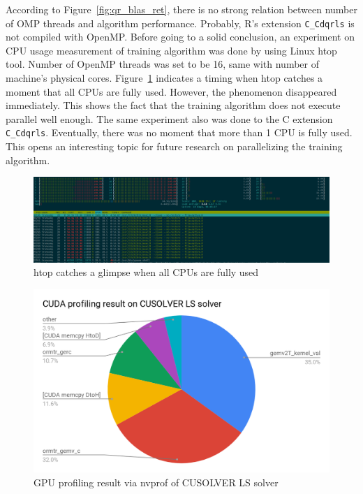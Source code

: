 \documentclass[English]{dicomopapers}
\begin{document}
 According to Figure~\ref{fig:qr_blas_ret}, there is no strong relation between number of OMP threads and algorithm performance. Probably, R's extension \texttt{C\_Cdqrls} is not compiled with OpenMP\@. Before going to a solid conclusion, an experiment on CPU usage measurement of training algorithm was done by using Linux htop tool. Number of OpenMP threads was set to be 16, same with number of machine's physical cores. Figure~\ref{fig:htop} indicates a timing when htop catches a moment that all CPUs are fully used. However, the phenomenon disappeared immediately. This shows the fact that the training algorithm does not execute parallel well enough. The same experiment also was done to the C extension \texttt{C\_Cdqrls}. Eventually, there was no moment that more than 1 CPU is fully used. This opens an interesting topic for future research on parallelizing the training algorithm.\newline

\begin{figure}[ht]
  \vspace*{-0.6cm}
  \centering
  \includegraphics[width=\columnwidth,natwidth=1902,natheight=550]{htop.png}
  \caption{htop catches a glimpse when all CPUs are fully used}\label{fig:htop}
\end{figure}

\begin{figure}[ht]
  \centering
  \includegraphics[width=\columnwidth,natwidth=1200,natheight=742]{nvprof_qr.png}
  \caption{GPU profiling result via nvprof of CUSOLVER LS solver}\label{fig:nvprof_qr}
\end{figure}
\end{document}
